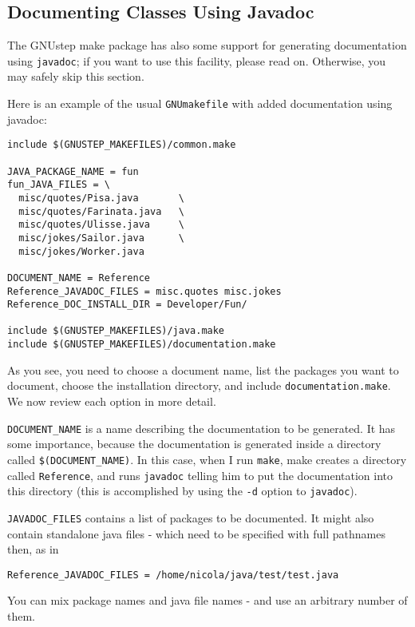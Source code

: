 \subsection{Documenting Classes Using Javadoc}

The GNUstep make package has also some support for generating
documentation using \texttt{javadoc}; if you want to use this
facility, please read on.  Otherwise, you may safely skip this
section.

Here is an example of the usual \texttt{GNUmakefile} with added
documentation using javadoc:
\begin{verbatim}
include $(GNUSTEP_MAKEFILES)/common.make

JAVA_PACKAGE_NAME = fun
fun_JAVA_FILES = \
  misc/quotes/Pisa.java       \
  misc/quotes/Farinata.java   \
  misc/quotes/Ulisse.java     \
  misc/jokes/Sailor.java      \
  misc/jokes/Worker.java

DOCUMENT_NAME = Reference
Reference_JAVADOC_FILES = misc.quotes misc.jokes
Reference_DOC_INSTALL_DIR = Developer/Fun/

include $(GNUSTEP_MAKEFILES)/java.make
include $(GNUSTEP_MAKEFILES)/documentation.make
\end{verbatim}%
As you see, you need to choose a document name, list the packages you
want to document, choose the installation directory, and include
\texttt{documentation.make}.  We now review each option in more detail.

\texttt{DOCUMENT\_NAME} is a name describing the documentation to be 
generated.  It has some importance, because the documentation is
generated inside a directory called \texttt{\$(DOCUMENT\_NAME)}.  In
this case, when I run \texttt{make}, make creates a directory called
\texttt{Reference}, and runs \texttt{javadoc} telling him to put 
the documentation into this directory (this is accomplished by using
the \texttt{-d} option to \texttt{javadoc}).

\texttt{JAVADOC\_FILES} contains a list of packages to be documented.  
It might also contain standalone java files - which need to be
specified with full pathnames then, as in 
\begin{verbatim}
Reference_JAVADOC_FILES = /home/nicola/java/test/test.java
\end{verbatim}
You can mix package names and java file names - and use an arbitrary
number of them.

